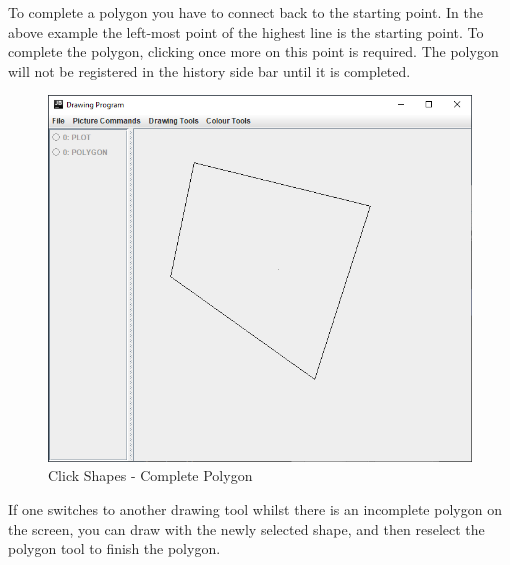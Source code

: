 \documentclass[12pt]{article} %
\begin{document}
To complete a polygon you have to connect back to the starting point. In the above example the left-most point of the highest line is the starting point. To complete the polygon, clicking once more on this point is required. The polygon will not be registered in the history side bar until it is completed.
\begin{figure}[H]
\caption{Click Shapes - Complete Polygon}
\centering
\includegraphics[scale=0.75]{pictures/clickThirdWindow.PNG}
\end{figure}

If one switches to another drawing tool whilst there is an incomplete polygon on the screen, you can draw with the newly selected shape, and then reselect the polygon tool to finish the polygon.
\end{document}
